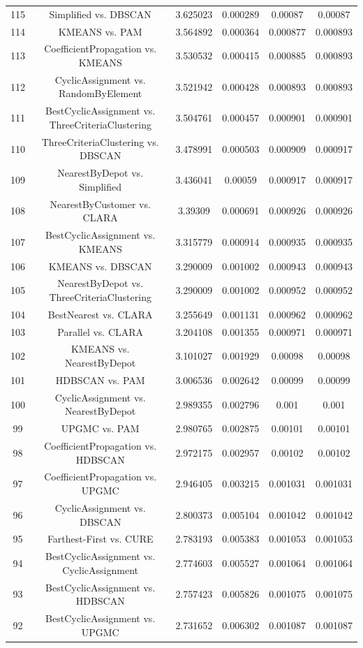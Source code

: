 \documentclass[a4paper,10pt]{article}
\begin{document}
\begin{landscape}
\begin{table}[!htp]
\begin{tabular}{cccccc}
115&Simplified vs. DBSCAN&3.625023&0.000289&0.00087&0.00087\\
114&KMEANS vs. PAM&3.564892&0.000364&0.000877&0.000893\\
113&CoefficientPropagation vs. KMEANS&3.530532&0.000415&0.000885&0.000893\\
112&CyclicAssignment vs. RandomByElement&3.521942&0.000428&0.000893&0.000893\\
111&BestCyclicAssignment vs. ThreeCriteriaClustering&3.504761&0.000457&0.000901&0.000901\\
110&ThreeCriteriaClustering vs. DBSCAN&3.478991&0.000503&0.000909&0.000917\\
109&NearestByDepot vs. Simplified&3.436041&0.00059&0.000917&0.000917\\
108&NearestByCustomer vs. CLARA&3.39309&0.000691&0.000926&0.000926\\
107&BestCyclicAssignment vs. KMEANS&3.315779&0.000914&0.000935&0.000935\\
106&KMEANS vs. DBSCAN&3.290009&0.001002&0.000943&0.000943\\
105&NearestByDepot vs. ThreeCriteriaClustering&3.290009&0.001002&0.000952&0.000952\\
104&BestNearest vs. CLARA&3.255649&0.001131&0.000962&0.000962\\
103&Parallel vs. CLARA&3.204108&0.001355&0.000971&0.000971\\
102&KMEANS vs. NearestByDepot&3.101027&0.001929&0.00098&0.00098\\
101&HDBSCAN vs. PAM&3.006536&0.002642&0.00099&0.00099\\
100&CyclicAssignment vs. NearestByDepot&2.989355&0.002796&0.001&0.001\\
99&UPGMC vs. PAM&2.980765&0.002875&0.00101&0.00101\\
98&CoefficientPropagation vs. HDBSCAN&2.972175&0.002957&0.00102&0.00102\\
97&CoefficientPropagation vs. UPGMC&2.946405&0.003215&0.001031&0.001031\\
96&CyclicAssignment vs. DBSCAN&2.800373&0.005104&0.001042&0.001042\\
95&Farthest-First vs. CURE&2.783193&0.005383&0.001053&0.001053\\
94&BestCyclicAssignment vs. CyclicAssignment&2.774603&0.005527&0.001064&0.001064\\
93&BestCyclicAssignment vs. HDBSCAN&2.757423&0.005826&0.001075&0.001075\\
92&BestCyclicAssignment vs. UPGMC&2.731652&0.006302&0.001087&0.001087\\

\end{tabular}
\end{table}
\end{landscape}
\end{document}
